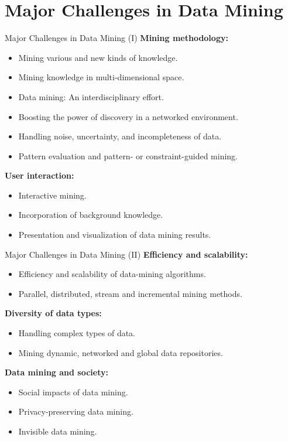\section{Major Challenges in Data Mining}

\begin{frame}{Major Challenges in Data Mining (I)}
	\textbf{Mining methodology:}\\
	\begin{itemize}
		\item Mining various and new kinds of knowledge.
		\item Mining knowledge in multi-dimensional space.
		\item Data mining: An interdisciplinary effort.
		\item Boosting the power of discovery in a networked environment.
		\item Handling noise, uncertainty, and incompleteness of data.
		\item Pattern evaluation and pattern- or constraint-guided mining.
	\end{itemize}
	\textbf{User interaction:}\\
	\begin{itemize}
		\item Interactive mining.
		\item Incorporation of background knowledge.
		\item Presentation and visualization of data mining results.
	\end{itemize}
\end{frame}

\begin{frame}{Major Challenges in Data Mining (II)}
	\textbf{Efficiency and scalability:}\\
	\begin{itemize}
		\item Efficiency and scalability of data-mining algorithms.
		\item Parallel, distributed, stream and incremental mining methods.
	\end{itemize}
	\textbf{Diversity of data types:}\\
	\begin{itemize}
		\item Handling complex types of data.
		\item Mining dynamic, networked and global data repositories.
	\end{itemize}
	\textbf{Data mining and society:}\\
	\begin{itemize}
		\item Social impacts of data mining.
		\item Privacy-preserving data mining.
		\item Invisible data mining.
	\end{itemize}
\end{frame}
